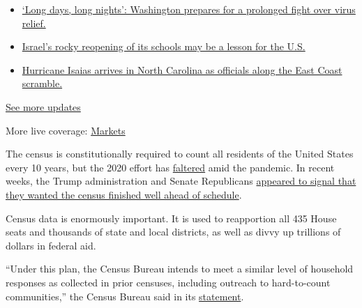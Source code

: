 \begin{itemize}
\tightlist
\item
  \href{https://www.nytimes.com/2020/08/04/world/coronavirus-covid-19.html?action=click\&pgtype=Article\&state=default\&region=MAIN_CONTENT_1\&context=storylines_live_updates\#link-6b644638}{`Long
  days, long nights': Washington prepares for a prolonged fight over
  virus relief.}
\item
  \href{https://www.nytimes.com/2020/08/04/world/coronavirus-covid-19.html?action=click\&pgtype=Article\&state=default\&region=MAIN_CONTENT_1\&context=storylines_live_updates\#link-7af9fca0}{Israel's
  rocky reopening of its schools may be a lesson for the U.S.}
\item
  \href{https://www.nytimes.com/2020/08/04/world/coronavirus-covid-19.html?action=click\&pgtype=Article\&state=default\&region=MAIN_CONTENT_1\&context=storylines_live_updates\#link-33bf9168}{Hurricane
  Isaias arrives in North Carolina as officials along the East Coast
  scramble.}
\end{itemize}

\href{https://www.nytimes.com/2020/08/04/world/coronavirus-covid-19.html?action=click\&pgtype=Article\&state=default\&region=MAIN_CONTENT_1\&context=storylines_live_updates}{See
more updates}

More live coverage:
\href{https://www.nytimes.com/live/2020/08/03/business/stock-market-today-coronavirus?action=click\&pgtype=Article\&state=default\&region=MAIN_CONTENT_1\&context=storylines_live_updates}{Markets}

The census is constitutionally required to count all residents of the
United States every 10 years, but the 2020 effort has
\href{https://www.nytimes.com/2020/04/18/us/coronavirus-census.html}{faltered}
amid the pandemic. In recent weeks, the Trump administration and Senate
Republicans
\href{https://www.nytimes.com/2020/07/28/us/trump-census.html}{appeared
to signal that they wanted the census finished well ahead of schedule}.

Census data is enormously important. It is used to reapportion all 435
House seats and thousands of state and local districts, as well as divvy
up trillions of dollars in federal aid.

``Under this plan, the Census Bureau intends to meet a similar level of
household responses as collected in prior censuses, including outreach
to hard-to-count communities,'' the Census Bureau said in its
\href{https://www.census.gov/newsroom/press-releases/2020/delivering-complete-accurate-count.html}{statement}.

